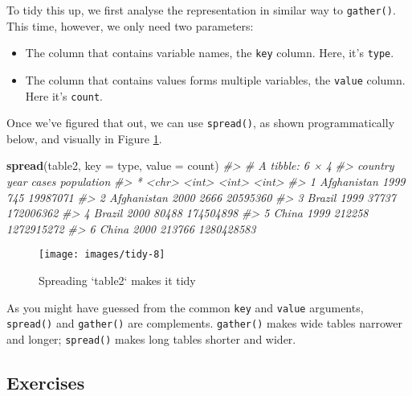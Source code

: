 \documentclass[]{book}
\newenvironment{Shaded}{\begin{snugshade}}{\end{snugshade}}
\newcommand{\KeywordTok}[1]{\textcolor[rgb]{0.13,0.29,0.53}{\textbf{{#1}}}}
\newcommand{\DataTypeTok}[1]{\textcolor[rgb]{0.13,0.29,0.53}{{#1}}}
\newcommand{\CommentTok}[1]{\textcolor[rgb]{0.56,0.35,0.01}{\textit{{#1}}}}
\newcommand{\NormalTok}[1]{{#1}}
\begin{document}
To tidy this up, we first analyse the representation in similar way to
\texttt{gather()}. This time, however, we only need two parameters:

\begin{itemize}
\item
  The column that contains variable names, the \texttt{key} column.
  Here, it's \texttt{type}.
\item
  The column that contains values forms multiple variables, the
  \texttt{value} column. Here it's \texttt{count}.
\end{itemize}

Once we've figured that out, we can use \texttt{spread()}, as shown
programmatically below, and visually in Figure \ref{fig:tidy-spread}.

\begin{Shaded}
\begin{Highlighting}[]
\KeywordTok{spread}\NormalTok{(table2, }\DataTypeTok{key =} \NormalTok{type, }\DataTypeTok{value =} \NormalTok{count)}
\CommentTok{#> # A tibble: 6 × 4}
\CommentTok{#>       country  year  cases population}
\CommentTok{#> *       <chr> <int>  <int>      <int>}
\CommentTok{#> 1 Afghanistan  1999    745   19987071}
\CommentTok{#> 2 Afghanistan  2000   2666   20595360}
\CommentTok{#> 3      Brazil  1999  37737  172006362}
\CommentTok{#> 4      Brazil  2000  80488  174504898}
\CommentTok{#> 5       China  1999 212258 1272915272}
\CommentTok{#> 6       China  2000 213766 1280428583}
\end{Highlighting}
\end{Shaded}

\begin{figure}

{\centering \texttt{[image: images/tidy-8]} 

}

\caption{Spreading `table2` makes it tidy}\label{fig:tidy-spread}
\end{figure}

As you might have guessed from the common \texttt{key} and
\texttt{value} arguments, \texttt{spread()} and \texttt{gather()} are
complements. \texttt{gather()} makes wide tables narrower and longer;
\texttt{spread()} makes long tables shorter and wider.

\subsection{Exercises}\label{exercises-22}
\end{document}
